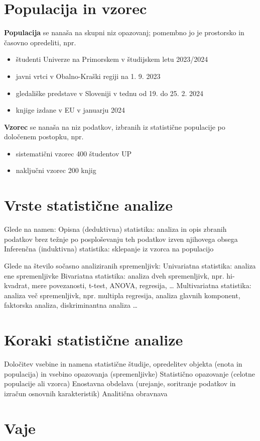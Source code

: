 \section*{Populacija in vzorec}

\textbf{Populacija} se nanaša na skupni niz opazovanj; pomembno jo je prostorsko in časovno opredeliti, npr.
\begin{itemize}
\item študenti Univerze na Primorskem v študijskem letu 2023/2024
\item javni vrtci v Obalno-Kraški regiji na 1. 9. 2023
\item gledališke predstave v Sloveniji v tednu od 19. do 25. 2. 2024
\item knjige izdane v EU v januarju 2024
\end{itemize}
\textbf{Vzorec} se nanaša na niz podatkov, izbranih iz statistične populacije po določenem postopku, npr.
\begin{itemize}
\item sistematični vzorec 400 študentov UP
\item naključni vzorec 200 knjig
\end{itemize}

\section*{Vrste statistične analize}

Glede na namen:
Opisna (deduktivna) statistika: analiza in opis zbranih podatkov brez težnje po posploševanju teh podatkov izven njihovega obsega
Inferenčna (induktivna) statistika: sklepanje iz vzorca na populacijo

Glede na število sočasno analiziranih spremenljivk:
Univariatna statistika: analiza ene spremenljivke
Bivariatna statistika: analiza dveh spremenljivk, npr. hi-kvadrat, mere povezanosti, t-test, ANOVA, regresija, …
Multivariatna statistika: analiza več spremenljivk, npr. multipla regresija, analiza glavnih komponent, faktorska analiza, diskriminantna analiza …

\section*{Koraki statistične analize}

Določitev vsebine in namena statistične študije, opredelitev objekta (enota in populacija) in vsebino opazovanja (spremenljivke)
Statistično opazovanje (celotne populacije ali vzorca)
Enostavna obdelava (urejanje, soritranje podatkov in izračun osnovnih karakteristik)
Analitična obravnava

\section*{Vaje}
